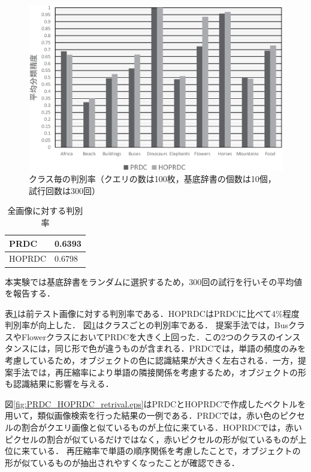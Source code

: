 \begin{figure}[tb]
\begin{center}
\includegraphics[clip, width=\columnwidth]{image/PRDCvsProposed.eps}
\caption{クラス毎の判別率（クエリの数は100枚，基底辞書の個数は10個，試行回数は300回）}
\label{fig:PRDCvsProposed.eps}
\end{center}
\end{figure}
\begin{table}
\caption{全画像に対する判別率}
\label{tab:Average_PRDCvsProposed}
\begin{center}
\begin{tabular}{|l||l|}
\hline
PRDC   & 0.6393 \\
\hline
HOPRDC & 0.6798 \\
\hline
\end{tabular}
\end{center}
\end{table}
本実験では基底辞書をランダムに選択するため，300回の試行を行いその平均値を報告する．

表\ref{tab:Average_PRDCvsProposed}は前テスト画像に対する判別率である．HOPRDCはPRDCに比べて4\%程度判別率が向上した．
図\ref{fig:PRDCvsProposed.eps}はクラスごとの判別率である．
提案手法では，BusクラスやFlowerクラスにおいてPRDCを大きく上回った．この2つのクラスのインスタンスには，同じ形で色が違うものが含まれる．PRDCでは，単語の頻度のみを考慮しているため，オブジェクトの色に認識結果が大きく左右される．一方，提案手法では，再圧縮率により単語の隣接関係を考慮するため，オブジェクトの形も認識結果に影響を与える．

図\ref{fig:PRDC_HOPRDC_retrival.eps}はPRDCとHOPRDCで作成したベクトルを用いて，類似画像検索を行った結果の一例である．PRDCでは，赤い色のピクセルの割合がクエリ画像と似ているものが上位に来ている．HOPRDCでは，赤いピクセルの割合が似ているだけではなく，赤いピクセルの形が似ているものが上位に来ている．
再圧縮率で単語の順序関係を考慮したことで，オブジェクトの形が似ているものが抽出されやすくなったことが確認できる．

